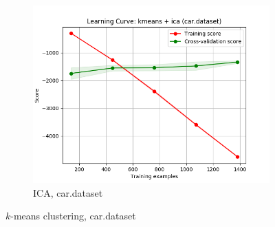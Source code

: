 \documentclass{article}
\begin{document}
\begin{figure}[htb]
\begin{subfigure}{0.33\textwidth}
        \includegraphics[width=\linewidth]{out/cluster_dr/car-kmeans-ica-learning.png}
        \caption{ICA, car.dataset}
      \end{subfigure}

    \caption{$k$-means clustering, car.dataset}
    \label{fig:cdr-plot-km-car}
    \end{figure}
\end{document}
